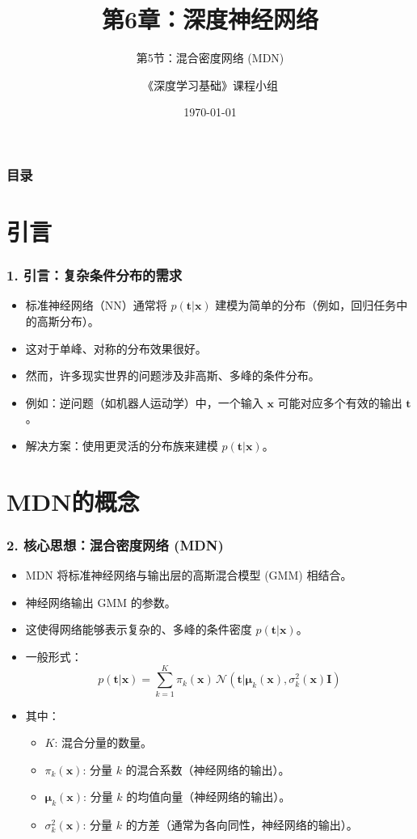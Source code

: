 \documentclass[t,aspectratio=169]{beamer} %
\title[6.5.混合密度网络]{第6章：深度神经网络}
\subtitle{第5节：混合密度网络 (MDN)}
\author{《深度学习基础》课程小组}
\date{\today}
\begin{document}
\frame{\titlepage}

\begin{frame}
    \frametitle{目录}
    \tableofcontents
\end{frame}

\section{引言}
\begin{frame}
    \frametitle{1. 引言：复杂条件分布的需求}
    \begin{itemize}
        \item 标准神经网络（NN）通常将 $ p(\mathbf{t} | \mathbf{x}) $ 建模为简单的分布（例如，回归任务中的高斯分布）。
        \item 这对于单峰、对称的分布效果很好。
        \item 然而，许多现实世界的问题涉及\alert{非高斯、多峰}的条件分布。
        \item 例如：逆问题（如机器人运动学）中，一个输入 $ \mathbf{x} $ 可能对应多个有效的输出 $ \mathbf{t} $。
        \item 解决方案：使用更灵活的分布族来建模 $ p(\mathbf{t} | \mathbf{x}) $。
    \end{itemize}
\end{frame}

\section{MDN的概念}
\begin{frame}
    \frametitle{2. 核心思想：混合密度网络 (MDN)}
    \begin{itemize}
        \item MDN 将标准神经网络与输出层的\alert{高斯混合模型 (GMM)} 相结合。
        \item 神经网络输出 GMM 的参数。
        \item 这使得网络能够表示复杂的、多峰的条件密度 $ p(\mathbf{t} | \mathbf{x}) $。
        \item 一般形式：
        \begin{equation*}
            p(\mathbf{t} | \mathbf{x}) = \sum_{k=1}^{K} \pi_k(\mathbf{x}) \, \mathcal{N}(\mathbf{t} | \boldsymbol{\mu}_k(\mathbf{x}), \sigma_k^2(\mathbf{x}) \mathbf{I})
        \end{equation*}
        \item 其中：
        \begin{itemize}
            \item $ K $: 混合分量的数量。
            \item $ \pi_k(\mathbf{x}) $: 分量 $ k $ 的混合系数（神经网络的输出）。
            \item $ \boldsymbol{\mu}_k(\mathbf{x}) $: 分量 $ k $ 的均值向量（神经网络的输出）。
            \item $ \sigma_k^2(\mathbf{x}) $: 分量 $ k $ 的方差（通常为各向同性，神经网络的输出）。
        \end{itemize}
    \end{itemize}
\end{frame}
\end{document}
